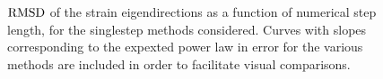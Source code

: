 \begin{figure}[htpb]
    \centering
    
    \caption[$\rmsd$ of the strain eigendirections as a function of numerical
    step length, for the singlestep methods considered]{$\rmsd$ of the strain
    eigendirections as a function of numerical step length, for the singlestep
    methods considered. Curves with slopes corresponding to the expexted power
    law in error for the various methods are included in order to facilitate
    visual comparisons.}
    \label{fig:xi2_err_fixed}
\end{figure}
